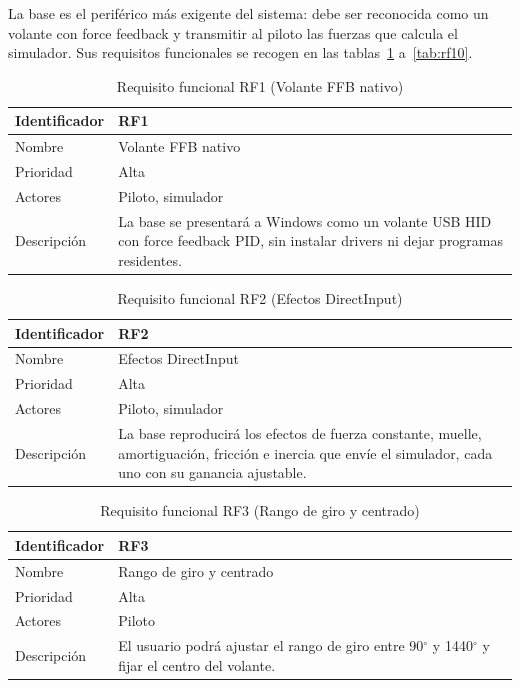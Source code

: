 La base es el periférico más exigente del sistema: debe ser reconocida como un volante con force feedback y transmitir al piloto las fuerzas que calcula el simulador. Sus requisitos funcionales se recogen en las tablas~\ref{tab:rf1} a~\ref{tab:rf10}.

\begin{table}[H]
	\centering
	\renewcommand{\arraystretch}{2}
	\begin{tabular}{|l|p{10cm}|}
		\hline
		Identificador & RF1 \\
		\hline
		Nombre & Volante FFB nativo \\
		\hline
		Prioridad & Alta \\
		\hline
		Actores & Piloto, simulador \\
		\hline
		Descripción & La base se presentará a Windows como un volante USB HID con force feedback PID, sin instalar drivers ni dejar programas residentes. \\
		\hline
	\end{tabular}
	\caption{Requisito funcional RF1 (Volante FFB nativo)}
	\label{tab:rf1}
\end{table}

\begin{table}[H]
	\centering
	\renewcommand{\arraystretch}{2}
	\begin{tabular}{|l|p{10cm}|}
		\hline
		Identificador & RF2 \\
		\hline
		Nombre & Efectos DirectInput \\
		\hline
		Prioridad & Alta \\
		\hline
		Actores & Piloto, simulador \\
		\hline
		Descripción & La base reproducirá los efectos de fuerza constante, muelle, amortiguación, fricción e inercia que envíe el simulador, cada uno con su ganancia ajustable. \\
		\hline
	\end{tabular}
	\caption{Requisito funcional RF2 (Efectos DirectInput)}
	\label{tab:rf2}
\end{table}

\begin{table}[H]
	\centering
	\renewcommand{\arraystretch}{2}
	\begin{tabular}{|l|p{10cm}|}
		\hline
		Identificador & RF3 \\
		\hline
		Nombre & Rango de giro y centrado \\
		\hline
		Prioridad & Alta \\
		\hline
		Actores & Piloto \\
		\hline
		Descripción & El usuario podrá ajustar el rango de giro entre 90$^{\circ}$ y 1440$^{\circ}$ y fijar el centro del volante. \\
		\hline
	\end{tabular}
	\caption{Requisito funcional RF3 (Rango de giro y centrado)}
	\label{tab:rf3}
\end{table}

